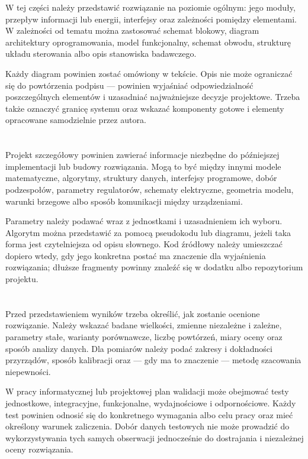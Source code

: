 W tej części należy przedstawić rozwiązanie na poziomie ogólnym: jego moduły, przepływ informacji lub energii, interfejsy oraz zależności pomiędzy elementami. W zależności od tematu można zastosować schemat blokowy, diagram architektury oprogramowania, model funkcjonalny, schemat obwodu, strukturę układu sterowania albo opis stanowiska badawczego.

Każdy diagram powinien zostać omówiony w tekście. Opis nie może ograniczać się do powtórzenia podpisu — powinien wyjaśniać odpowiedzialność poszczególnych elementów i uzasadniać najważniejsze decyzje projektowe. Trzeba także oznaczyć granicę systemu oraz wskazać komponenty gotowe i elementy opracowane samodzielnie przez autora.

\section{}

Projekt szczegółowy powinien zawierać informacje niezbędne do późniejszej implementacji lub budowy rozwiązania. Mogą to być między innymi modele matematyczne, algorytmy, struktury danych, interfejsy programowe, dobór podzespołów, parametry regulatorów, schematy elektryczne, geometria modelu, warunki brzegowe albo sposób komunikacji między urządzeniami.

Parametry należy podawać wraz z jednostkami i uzasadnieniem ich wyboru. Algorytm można przedstawić za pomocą pseudokodu lub diagramu, jeżeli taka forma jest czytelniejsza od opisu słownego. Kod źródłowy należy umieszczać dopiero wtedy, gdy jego konkretna postać ma znaczenie dla wyjaśnienia rozwiązania; dłuższe fragmenty powinny znaleźć się w dodatku albo repozytorium projektu.

\section{}

Przed przedstawieniem wyników trzeba określić, jak zostanie ocenione rozwiązanie. Należy wskazać badane wielkości, zmienne niezależne i zależne, parametry stałe, warianty porównawcze, liczbę powtórzeń, miary oceny oraz sposób analizy danych. Dla pomiarów należy podać zakresy i dokładności przyrządów, sposób kalibracji oraz — gdy ma to znaczenie — metodę szacowania niepewności.

W pracy informatycznej lub projektowej plan walidacji może obejmować testy jednostkowe, integracyjne, funkcjonalne, wydajnościowe i odpornościowe. Każdy test powinien odnosić się do konkretnego wymagania albo celu pracy oraz mieć określony warunek zaliczenia. Dobór danych testowych nie może prowadzić do wykorzystywania tych samych obserwacji jednocześnie do dostrajania i niezależnej oceny rozwiązania.

